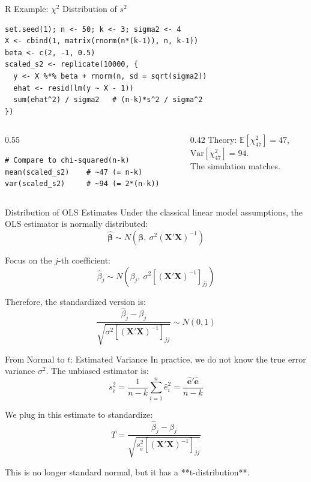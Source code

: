 \documentclass[aspectratio=169, handout, t]{beamer}
\numberwithin{equation}{section}
\begin{document}
\begin{frame}[fragile]{R Example: $\chi^2$ Distribution of $s^2$}
\begin{lstlisting}[style=Rstyle]
set.seed(1); n <- 50; k <- 3; sigma2 <- 4
X <- cbind(1, matrix(rnorm(n*(k-1)), n, k-1))
beta <- c(2, -1, 0.5)
scaled_s2 <- replicate(10000, {
  y <- X %*% beta + rnorm(n, sd = sqrt(sigma2))
  ehat <- resid(lm(y ~ X - 1))
  sum(ehat^2) / sigma2   # (n-k)*s^2 / sigma^2
})
\end{lstlisting}\pause
\begin{columns}
\begin{column}{0.55\textwidth}
\begin{lstlisting}[style=Rstyle]
# Compare to chi-squared(n-k)
mean(scaled_s2)    # ~47 (= n-k)
var(scaled_s2)     # ~94 (= 2*(n-k))
\end{lstlisting}
\end{column}
\begin{column}{0.42\textwidth}
Theory: $\mathbb{E}[\chi^2_{47}]=47$,\\ $\text{Var}[\chi^2_{47}]=94$.\\[4pt]
The simulation matches.
\end{column}
\end{columns}
\end{frame}

\begin{frame}{Distribution of OLS Estimates}
Under the classical linear model assumptions, the OLS estimator is normally distributed:
\[
\hat{\bm{\beta}} \sim N(\bm{\beta},\ \sigma^2 (\bm{X'X})^{-1})
\]

Focus on the \( j \)-th coefficient:
\[
\hat{\beta}_j \sim N\left(\beta_j,\ \sigma^2 \left[(\bm{X'X})^{-1}\right]_{jj}\right)
\]

Therefore, the standardized version is:
\[
\frac{\hat{\beta}_j - \beta_j}{\sqrt{\sigma^2 \left[(\bm{X'X})^{-1}\right]_{jj}}} \sim N(0, 1)
\]
\end{frame}


\begin{frame}{From Normal to $t$: Estimated Variance}
In practice, we do not know the true error variance \( \sigma^2 \).  
The unbiased estimator is:
\[
s_{\hat{e}}^2 = \frac{1}{n - k} \sum_{i=1}^n \hat{e}_i^2 = \frac{\hat{\bm{e}}' \hat{\bm{e}}}{n - k}
\]

We plug in this estimate to standardize:
\[
T = \frac{\hat{\beta}_j - \beta_j}{\sqrt{s_{\hat{e}}^2 \left[(\bm{X'X})^{-1}\right]_{jj}}}
\]

This is no longer standard normal, but it has a **t-distribution**.
\end{frame}
\end{document}
